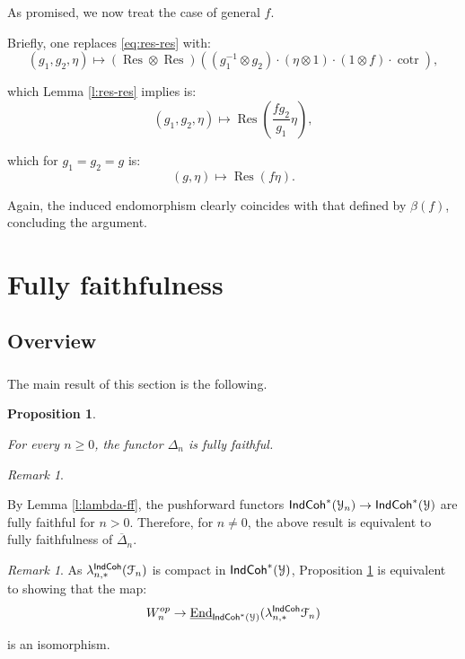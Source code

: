 \documentclass[reqno,11pt]{amsart}
\numberwithin{equation}{subsection}
\newtheorem{prop}[thm]{Proposition}
\theoremstyle{remark}
\newtheorem{rem}[thm]{Remark}
\newcommand{\sF}{{\EuScript F}}
\newcommand{\sY}{{\EuScript Y}}
\newcommand{\on}{\operatorname}
\newcommand{\ol}[1]{\overline{#1}{}}
\newcommand{\ul}{\underline}
\newcommand{\End}{\on{End}}
\newcommand{\cotr}{\on{cotr}}
\newcommand{\Res}{\on{Res}}
\newcommand{\IndCoh}{\mathsf{IndCoh}}
\begin{document}
\subsubsection{}\label{sss:gen'l-f}

As promised, we now treat the case of general $f$.

Briefly, one replaces \eqref{eq:res-res} with:
%
\[
(g_1,g_2,\eta) \mapsto 
(\Res \otimes \Res)((g_1^{-1} \otimes g_2) \cdot 
(\eta \otimes 1) \cdot (1 \otimes f) \cdot \cotr),
\]

\noindent which Lemma \ref{l:res-res} implies is:
%
\[
(g_1,g_2,\eta) \mapsto \Res(\frac{f g_2}{g_1}\eta),
\]

\noindent which for $g_1 = g_2 = g$ is:
%
\[
(g,\eta) \mapsto \Res(f \eta).
\]

\noindent Again, the induced endomorphism clearly coincides with that 
defined by $\beta(f)$, concluding the argument.

\section{Fully faithfulness}\label{s:ff}

\subsection{Overview}

\subsubsection{}

The main result of this section is the following.

\begin{prop}\label{p:ff}

For every $n \geq 0$, the functor $\Delta_n$ is fully faithful.

\end{prop}

\begin{rem}\label{r:kash-y}

By Lemma \ref{l:lambda-ff}, the pushforward
functors $\IndCoh^*(\sY_n) \to \IndCoh^*(\sY)$ are fully faithful
for $n>0$. Therefore, for $n \neq 0$, the above result is equivalent
to fully faithfulness of $\ol{\Delta}_n$. 

\end{rem}

\begin{rem}

As $\lambda_{n,*}^{\IndCoh}(\sF_n)$ is compact in 
$\IndCoh^*(\sY)$, Proposition \ref{p:ff} is equivalent to showing
that the map:
%
\[
W_n^{op} \to \ul{\End}_{\IndCoh^*(\sY)}(\lambda_{n,*}^{\IndCoh}\sF_n)
\]

\noindent is an isomorphism.

\end{rem}
\end{document}
